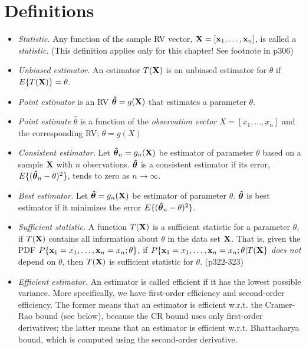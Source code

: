 \documentclass[a4paper, oneside]{book}
\begin{document}
\section{Definitions}
\begin{itemize}
\item \textit{Statistic.} Any function of the sample RV vector, $\mathbf{X}=[\mathbf{x}_1,\hdots,\mathbf{x}_n]$, is called a \textit{statistic}. (This definition applies only for this chapter! See footnote in p306)
\item \textit{Unbiased estimator.} An estimator $T(\mathbf{X})$ is an unbiased estimator for $\theta$ if $E\{T(\mathbf{X})\}=\theta$.
\item \textit{Point estimator} is an RV $\boldsymbol{\hat{\theta}}=g(\mathbf{X})$  that estimates a parameter $\theta$.
\item \textit{Point estimate} $\hat{\theta}$ is a function of the \textit{observation vector} $X=[x_1, \hdots, x_n]$ and the corresponding RV; \ie $\hat{\theta}=g(X)$
\item \textit{Consistent estimator.} Let $\boldsymbol{\hat{\theta}}_n=g_n(\mathbf{X})$ be estimator of parameter $\theta$ based on a sample $\mathbf{X}$ with $n$ observations. $\boldsymbol{\hat{\theta}}$ is a consistent estimator if its error, $E\{(\boldsymbol{\hat{\theta}}_n-\theta)^2\}$, tends to zero as $n\to \infty$.
\item \textit{Best estimator.} Let $\boldsymbol{\hat{\theta}}=g_n(\mathbf{X})$ be estimator of parameter $\theta$. $\boldsymbol{\hat{\theta}}$ is best estimator if it minimizes the error $E\{(\boldsymbol{\hat{\theta}}_n-\theta)^2\}$.
\item \textit{Sufficient statistic.} A function $T(\mathbf{X})$ is a sufficient statistic for a parameter $\theta$, if $T(\mathbf{X})$ contains all information about $\theta$ in the data set $\mathbf{X}$. That is, given the PDF $P\{\mathbf{x}_1=x_1,\hdots,\mathbf{x}_n=x_n; \theta\}$, if $P\{\mathbf{x}_1=x_1,\hdots,\mathbf{x}_n=x_n; \theta | T(\mathbf{X}\}$ \textit{does not} depend on $\theta$, then $T(\mathbf{X})$ is sufficient statistic for $\theta$. (p322-323)
\item \textit{Efficient estimator.} An estimator is called efficient if it has the lowest possible variance. More specifically, we have first-order efficiency and second-order efficiency. The former means that an estimator is efficient w.r.t. the Cramer-Rao bound (see below), because the CR bound uses only first-order derivatives; the latter means that an estimator is efficient w.r.t. Bhattacharya bound, which is computed using the second-order derivative.
\end{itemize}
\end{document}
